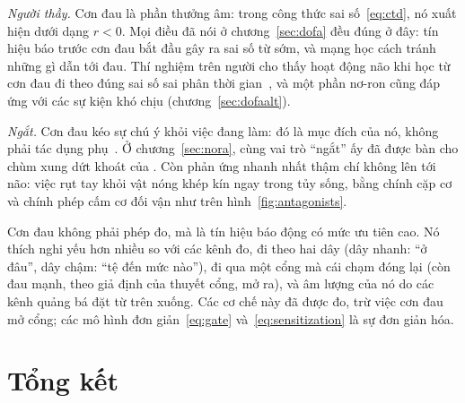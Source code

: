 \emph{Người thầy.} Cơn đau là phần thưởng âm: trong công thức sai số~\eqref{eq:ctd}, nó xuất hiện dưới dạng $r<0$. Mọi điều đã nói ở chương~\ref{sec:dofa} đều đúng ở đây: tín hiệu báo trước cơn đau bắt đầu gây ra sai số từ sớm, và mạng học cách tránh những gì dẫn tới đau. Thí nghiệm trên người cho thấy hoạt động não khi học từ cơn đau đi theo đúng sai số sai phân thời gian~\cite{Seymour2004}, và một phần nơ-ron  cũng đáp ứng với các sự kiện khó chịu (chương~\ref{sec:dofaalt}).

\emph{Ngắt.} Cơn đau kéo sự chú ý khỏi việc đang làm: đó là mục đích của nó, không phải tác dụng phụ~\cite{EcclestonCrombez1999}. Ở chương~\ref{sec:nora}, cùng vai trò ``ngắt'' ấy đã được bàn cho chùm xung dứt khoát của . Còn phản ứng nhanh nhất thậm chí không lên tới não: việc rụt tay khỏi vật nóng khép kín ngay trong tủy sống, bằng chính cặp cơ và chính phép cấm cơ đối vận như trên hình~\ref{fig:antagonists}.

\begin{keyblock}
\begin{proposition}
\label{prop:pain}
Cơn đau không phải phép đo, mà là tín hiệu báo động có mức ưu tiên cao. Nó thích nghi yếu hơn nhiều so với các kênh đo, đi theo hai dây (dây nhanh: ``ở đâu'', dây chậm: ``tệ đến mức nào''), đi qua một cổng mà cái chạm đóng lại (còn đau mạnh, theo giả định của thuyết cổng, mở ra), và âm lượng của nó do các kênh quảng bá đặt từ trên xuống. Các cơ chế này đã được đo, trừ việc cơn đau mở cổng; các mô hình đơn giản~\eqref{eq:gate} và~\eqref{eq:sensitization} là sự đơn giản hóa.
\end{proposition}
\end{keyblock}

\section{Tổng kết}

